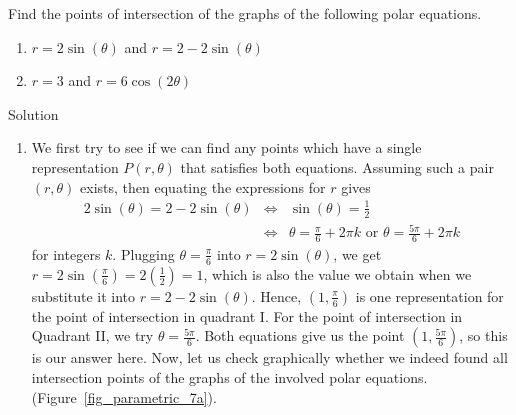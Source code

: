 \begin{example}  \label{polargraphintex} Find the points of intersection of the graphs of the following polar equations.

\begin{multicols}{2}
\begin{enumerate}

\item  \label{circcardint} $r =2\sin(\theta)$ and $r = 2 - 2\sin(\theta)$

\item \label{circroseint} $r=3$ and  $r = 6\cos(2\theta)$

\end{enumerate}
\end{multicols}

Solution 

\begin{enumerate}
\item  We first try to see if we can find any points which have a single representation $P(r,\theta)$ that satisfies both equations.  Assuming such a pair $(r,\theta)$ exists, then equating the expressions for $r$ gives \begin{eqnarray*}
2\sin(\theta) = 2-2\sin(\theta)&\Leftrightarrow&\sin(\theta) = \frac{1}{2}\\
&\Leftrightarrow&\theta = \frac{\pi}{6} + 2\pi k \text{ or }\theta = \frac{5\pi}{6} + 2\pi k
\end{eqnarray*}
for integers $k$.  Plugging $\theta = \frac{\pi}{6}$ into $r = 2\sin(\theta)$, we get $r = 2\sin\left(\frac{\pi}{6}\right) = 2\left(\frac{1}{2}\right) = 1$, which is also the value we obtain when we substitute it into $r = 2-2\sin(\theta)$.  Hence, $\left(1, \frac{\pi}{6}\right)$ is one representation for the point of intersection in quadrant I. For the point of intersection in Quadrant II, we try $\theta = \frac{5\pi}{6}$. Both equations give us the point $\left(1, \frac{5\pi}{6}\right)$, so this is our answer here. Now, let us check graphically whether we indeed found all intersection points of the graphs of the involved polar equations.  (Figure~\ref{fig_parametric_7a}). 


\end{enumerate}
\end{example}
